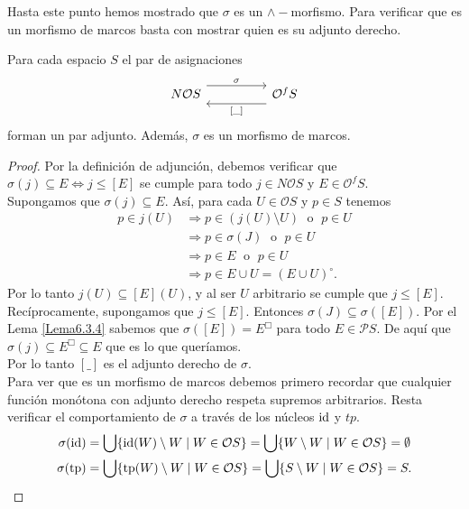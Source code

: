 Hasta este punto hemos mostrado que $\sigma$ es un $\wedge-$morfismo. Para verificar que es un morfismo de marcos basta con mostrar quien es su adjunto derecho.

\begin{thm}\label{Teorema6.3.5}
    Para cada espacio $S$ el par de asignaciones 
    \[\begin{tikzcd}
	{N\mathcal{O}S} && {\mathcal{O}^fS}
	\arrow["\sigma", shift left=3, from=1-1, to=1-3]
	\arrow["{[ \_ ]}", shift left=3, from=1-3, to=1-1]
\end{tikzcd}\]
forman un par adjunto. Además, $\sigma$ es un morfismo de marcos.
\end{thm}

\begin{proof}
    Por la definición de adjunción, debemos verificar que $\sigma(j)\subseteq E\Leftrightarrow j\leq [E]$ se cumple para todo $j\in N\mathcal{O}S$ y $E\in \mathcal{O}^fS$.\\

    Supongamos que $\sigma(j)\subseteq E$. Así, para cada $U\in \mathcal{O}S$ y $p\in S$ tenemos 
    \[
    \begin{split}
        p\in j(U) &\Rightarrow  p\in (j(U)\setminus U)\;\mbox{ o }\; p\in U\\
        & \Rightarrow p\in \sigma(J) \; \mbox{ o }\; p\in U\\
        & \Rightarrow p\in E \;\mbox{ o }\; p\in U\\
        & \Rightarrow p\in E\cup U=(E\cup U)^\circ.
    \end{split}
    \]
    Por lo tanto $j(U)\subseteq [E](U)$, y al ser $U$ arbitrario se cumple que $j\leq [E]$.\\

    Recíprocamente, supongamos que $j\leq [E]$. Entonces $\sigma(J)\subseteq \sigma([E])$. Por el Lema \ref{Lema6.3.4} sabemos que $\sigma([E])=E^\Box$ para todo $E\in \mathcal{P}S$. De aquí que $\sigma(j)\subseteq E^\Box\subseteq E$ que es lo que queríamos.\\

    Por lo tanto $[ \_ ]$ es el adjunto derecho de $\sigma$.\\

    Para ver que es un morfismo de marcos debemos primero recordar que cualquier función monótona con adjunto derecho respeta supremos arbitrarios. Resta verificar el comportamiento de $\sigma$ a través de los núcleos $\mathrm{id}$ y $tp$.
    \[
    \begin{split}
    \sigma(\mathrm{id})& =\bigcup\{\mathrm{id}(W)\setminus W\mid W\in \mathcal{O}S\}=\bigcup\{W\setminus W\mid W\in \mathcal{O}S\}=\emptyset\\
    \sigma(\mathrm{tp})& =\bigcup\{\mathrm{tp}(W)\setminus W\mid W\in \mathcal{O}S\}=\bigcup\{S\setminus W\mid W\in \mathcal{O}S\}=S.
    \end{split}
    \]
\end{proof}

